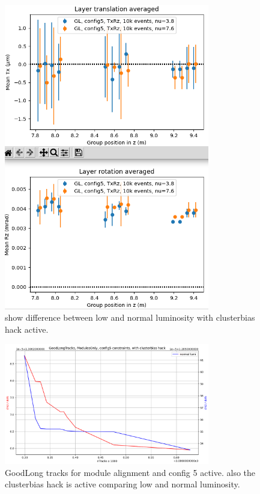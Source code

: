 \begin{figure}
  \centering
  \includegraphics[width=0.8\textwidth]{plots/jan_24_2022/low_normal_with_hack.png}
  \caption{show difference between low and normal luminosity with clusterbias hack active.}
  \label{fig:lumi_low_normal_hack_on}
\end{figure}

\begin{figure}
  \centering
  \includegraphics[width=0.8\textwidth]{plots/feb_2_2022/GL_modules_c5_cb_hackactive_low_normal_lumi.png}
  \caption{GoodLong tracks for module alignment and config 5 active. also the clusterbias hack is active comparing low and normal luminosity.}
  \label{fig:GL_lumi_low_normal_hack_on}
\end{figure}

